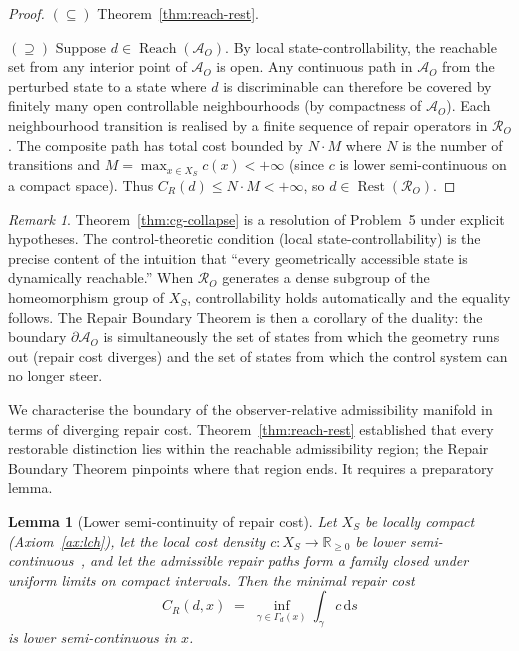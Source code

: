 \documentclass[12pt, oneside]{article}
\theoremstyle{plain}
\newtheorem{lemma}[theorem]{Lemma}
\theoremstyle{definition}
\theoremstyle{remark}
\newtheorem{remark}[theorem]{Remark}
\theoremstyle{definition}
\DeclareMathOperator{\Rest}{Rest}
\DeclareMathOperator{\Reach}{Reach}
\newcommand{\CR}{C_{\!R}}
\newcommand{\AO}{\mathcal{A}_O}
\newcommand{\bA}{\partial\mathcal{A}}
\newcommand{\Xsub}{X_S}
\begin{document}
\begin{proof}
  $(\subseteq)$\; Theorem~\ref{thm:reach-rest}.

  $(\supseteq)$\;
  Suppose $d \in \Reach(\AO)$.
  By local state-controllability, the reachable set from any interior
  point of $\AO$ is open.
  Any continuous path in $\AO$ from the perturbed state to a state
  where $d$ is discriminable can therefore be covered by finitely many
  open controllable neighbourhoods (by compactness of $\AO$).
  Each neighbourhood transition is realised by a finite sequence of
  repair operators in $\mathcal{R}_O$.
  The composite path has total cost bounded by $N \cdot M$ where
  $N$ is the number of transitions and $M = \max_{x \in \Xsub} c(x)
  < +\infty$ (since $c$ is lower semi-continuous on a compact space).
  Thus $\CR(d) \leq N \cdot M < +\infty$, so $d \in \Rest(\mathcal{R}_O)$.
\end{proof}

\begin{remark}
  Theorem~\ref{thm:cg-collapse} is a resolution of Problem~5 under
  explicit hypotheses.
  The control-theoretic condition (local state-controllability) is the
  precise content of the intuition that ``every geometrically accessible
  state is dynamically reachable.''
  When $\mathcal{R}_O$ generates a dense subgroup of the homeomorphism
  group of $\Xsub$, controllability holds automatically and the
  equality follows.
  The Repair Boundary Theorem is then a corollary of the duality:
  the boundary $\bA_O$ is simultaneously the set of states from which
  the geometry runs out (repair cost diverges) and the set of states
  from which the control system can no longer steer.
\end{remark}




We characterise the boundary of the observer-relative admissibility
manifold in terms of diverging repair cost.
Theorem~\ref{thm:reach-rest} established that every restorable
distinction lies within the reachable admissibility region;
the Repair Boundary Theorem pinpoints where that region ends.
It requires a preparatory lemma.

\begin{lemma}[Lower semi-continuity of repair cost]
  Let $\Xsub$ be locally compact (Axiom~\ref{ax:lch}), let the local
  cost density $c : \Xsub \to \mathbb{R}_{\geq 0}$ be lower
  semi-continuous~\cite{RockafellarWets1998}, and let the admissible
  repair paths form a family closed under uniform limits on compact
  intervals.
  Then the minimal repair cost
  \[
    \CR(d, x)
    \;=\;
    \inf_{\gamma \in \Gamma_d(x)}
    \int_{\gamma} c\, \mathrm{d}s
  \]
  is lower semi-continuous in $x$.
  \label{lem:lsc}
\end{lemma}
\end{document}
